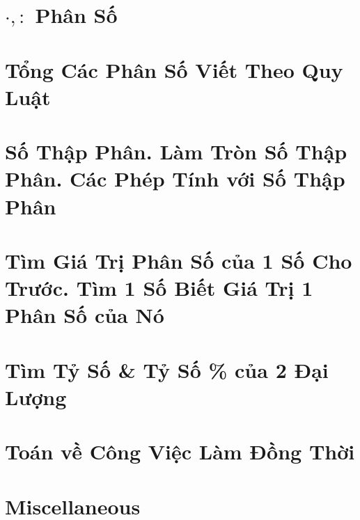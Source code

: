 \documentclass{article}
\begin{document}
\section{$\cdot,:$ Phân Số}


\section{Tổng Các Phân Số Viết Theo Quy Luật}


\section{Số Thập Phân. Làm Tròn Số Thập Phân. Các Phép Tính với Số Thập Phân}


\section{Tìm Giá Trị Phân Số của 1 Số Cho Trước. Tìm 1 Số Biết Giá Trị 1 Phân Số của Nó}


\section{Tìm Tỷ Số \& Tỷ Số \% của 2 Đại Lượng}


\section{Toán về Công Việc Làm Đồng Thời}


\section{Miscellaneous}


\printbibliography[heading=bibintoc]
	
\end{document}
